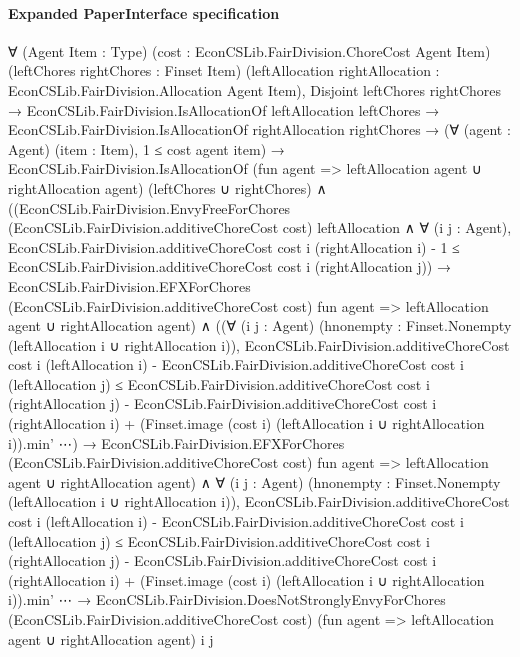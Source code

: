 \documentclass[10pt]{article}
\begin{document}
\paragraph{Expanded PaperInterface specification}
\begin{ReviewVerbatim}
∀ (Agent Item : Type) (cost : EconCSLib.FairDivision.ChoreCost Agent Item) (leftChores rightChores : Finset Item)
  (leftAllocation rightAllocation : EconCSLib.FairDivision.Allocation Agent Item),
  Disjoint leftChores rightChores →
    EconCSLib.FairDivision.IsAllocationOf leftAllocation leftChores →
      EconCSLib.FairDivision.IsAllocationOf rightAllocation rightChores →
        (∀ (agent : Agent) (item : Item), 1 ≤ cost agent item) →
          EconCSLib.FairDivision.IsAllocationOf (fun agent => leftAllocation agent ∪ rightAllocation agent)
              (leftChores ∪ rightChores) ∧
            ((EconCSLib.FairDivision.EnvyFreeForChores (EconCSLib.FairDivision.additiveChoreCost cost) leftAllocation ∧
                  ∀ (i j : Agent),
                    EconCSLib.FairDivision.additiveChoreCost cost i (rightAllocation i) - 1 ≤
                      EconCSLib.FairDivision.additiveChoreCost cost i (rightAllocation j)) →
                EconCSLib.FairDivision.EFXForChores (EconCSLib.FairDivision.additiveChoreCost cost) fun agent =>
                  leftAllocation agent ∪ rightAllocation agent) ∧
              ((∀ (i j : Agent) (hnonempty : Finset.Nonempty (leftAllocation i ∪ rightAllocation i)),
                    EconCSLib.FairDivision.additiveChoreCost cost i (leftAllocation i) -
                        EconCSLib.FairDivision.additiveChoreCost cost i (leftAllocation j) ≤
                      EconCSLib.FairDivision.additiveChoreCost cost i (rightAllocation j) -
                          EconCSLib.FairDivision.additiveChoreCost cost i (rightAllocation i) +
                        (Finset.image (cost i) (leftAllocation i ∪ rightAllocation i)).min' ⋯) →
                  EconCSLib.FairDivision.EFXForChores (EconCSLib.FairDivision.additiveChoreCost cost) fun agent =>
                    leftAllocation agent ∪ rightAllocation agent) ∧
                ∀ (i j : Agent) (hnonempty : Finset.Nonempty (leftAllocation i ∪ rightAllocation i)),
                  EconCSLib.FairDivision.additiveChoreCost cost i (leftAllocation i) -
                        EconCSLib.FairDivision.additiveChoreCost cost i (leftAllocation j) ≤
                      EconCSLib.FairDivision.additiveChoreCost cost i (rightAllocation j) -
                          EconCSLib.FairDivision.additiveChoreCost cost i (rightAllocation i) +
                        (Finset.image (cost i) (leftAllocation i ∪ rightAllocation i)).min' ⋯ →
                    EconCSLib.FairDivision.DoesNotStronglyEnvyForChores (EconCSLib.FairDivision.additiveChoreCost cost)
                      (fun agent => leftAllocation agent ∪ rightAllocation agent) i j
\end{ReviewVerbatim}
\end{document}
